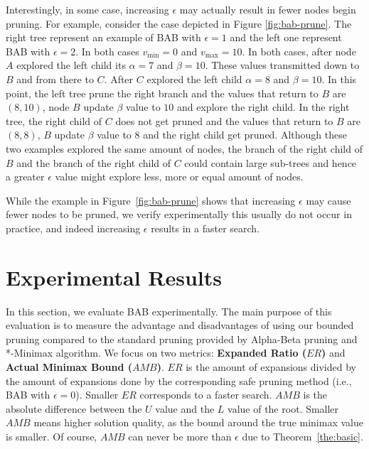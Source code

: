 \documentclass[runningheads]{llncs}
\newcommand{\pess}{\mathit{L}}
\newcommand{\opti}{\mathit{U}}
\newcommand{\vmax}{v_{\text{max}}}
\newcommand{\vmin}{v_{\text{min}}}
\newcommand{\amb}{\mathit{AMB}}
\newcommand{\er}{\mathit{ER}}
\begin{document}
Interestingly, in some case, increasing $\epsilon$ may actually result in fewer nodes begin pruning. For example, consider the case depicted in 
Figure \ref{fig:bab-prune}. The right tree represent an example of BAB with $\epsilon = 1$ and the left one represent BAB with $\epsilon = 2$. In both cases $\vmin = 0$ and $\vmax = 10$. In both cases, after node $A$ explored the left child its $\alpha = 7$ and $\beta = 10$. These values transmitted down to $B$ and from there to $C$. After $C$ explored the left child $\alpha = 8$ and $\beta = 10$. In this point, the left tree prune the right branch and the values that return to $B$ are $(8,10)$, node $B$ update $\beta$ value to $10$ and explore the right child. In the right tree, the right child of $C$ does not get pruned and the values that return to $B$ are $(8,8)$, $B$ update $\beta$ value to $8$ and the right child get pruned. Although these two examples explored the same amount of nodes, the branch of the right child of $B$ and the branch of the right child of $C$ could contain large sub-trees and hence a greater $\epsilon$ value might explore less, more or equal amount of nodes. 


While the example in Figure~\ref{fig:bab-prune} shows that increasing $\epsilon$ may cause fewer nodes to be pruned, we verify experimentally  this usually do not occur in practice, and indeed increasing $\epsilon$ results in a faster search. %






\section{Experimental Results}

In this section, we evaluate BAB experimentally. 
The main purpose of this evaluation is to measure the advantage and disadvantages of using our bounded pruning compared to the standard pruning provided by Alpha-Beta pruning and *-Minimax algorithm. We focus on two metrics: {\bf Expanded Ratio ($\er$)} and {\bf Actual Minimax Bound ($\amb$)}. $\er$ is the amount of expansions divided by the amount of expansions done by the corresponding safe pruning method (i.e., BAB with $\epsilon=0$). Smaller $\er$ corresponds to a faster search. 
$\amb$ is the absolute difference between the $\opti$ value and the $\pess$ value of the root. Smaller $\amb$ means higher solution quality, as the bound around the true minimax value is smaller. Of course, $\amb$ can never be more than $\epsilon$ due to Theorem~\ref{the:basic}.
\end{document}

